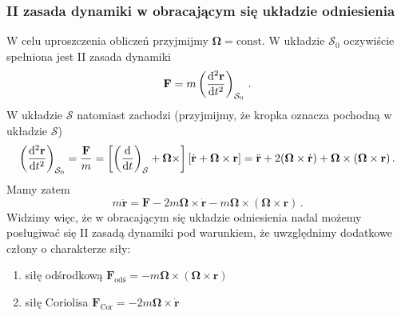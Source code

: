 \documentclass[../main.tex]{subfiles}
\begin{document}
\subsubsection{II zasada dynamiki w obracającym się układzie odniesienia}
W celu uproszczenia obliczeń przyjmijmy \(\boldsymbol{\Omega}=\text{const}\). W układzie
\(\mathcal{S}_0\) oczywiście spełniona jest II zasada dynamiki
\begin{equation*}
    \mathbf{F}=m\left(\dv[2]{\mathbf{r}}{t}\right)_{\mathcal{S}_0}\,.
\end{equation*}
W układzie \(\mathcal{S}\) natomiast zachodzi (przyjmijmy, że kropka oznacza pochodną w układzie
\(\mathcal{S}\))
\begin{equation*}
    \left(\dv[2]{\mathbf{r}}{t}\right)_{\mathcal{S}_0}=\frac{\mathbf{F}}{m}=\left[\left(\dv{}{t}\right)_\mathcal{S}+\boldsymbol{\Omega}\times\right]\left[\dot{\mathbf{r}}+\boldsymbol{\Omega}\times\mathbf{r}\right]=\ddot{\mathbf{r}}+2(\boldsymbol{\Omega}\times\dot{\mathbf{r}})+\boldsymbol{\Omega}\times(\boldsymbol{\Omega}\times\mathbf{r})\,.
\end{equation*}
Mamy zatem
\begin{equation*}
    m\ddot{\mathbf{r}}=\mathbf{F}-2m\boldsymbol{\Omega}\times\dot{\mathbf{r}}-m\boldsymbol{\Omega}\times(\boldsymbol{\Omega}\times\mathbf{r})\,.
\end{equation*}
Widzimy więc, że w obracającym się układzie odniesienia nadal możemy posługiwać się II zasadą
dynamiki pod warunkiem, że uwzględnimy dodatkowe człony o charakterze siły:
\begin{enumerate}
    \item siłę odśrodkową
    \(\mathbf{F}_\text{odś}=-m\boldsymbol{\Omega}\times(\boldsymbol{\Omega}\times\mathbf{r})\)
    \item siłę Coriolisa \(\mathbf{F}_\text{Cor}=-2m\boldsymbol{\Omega}\times\dot{\mathbf{r}}\)
\end{enumerate}
\end{document}
